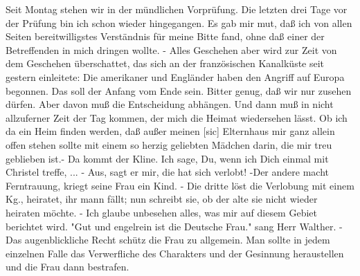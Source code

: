 \def\day{7. Juni 1944.}
\mktitle

Seit Montag stehen wir in der m\"{u}ndlichen Vorpr\"{u}fung.
Die letzten drei Tage vor der Pr\"{u}fung bin ich schon wieder hingegangen.
Es gab mir mut, da{\ss} ich von allen Seiten bereitwilligstes Verst\"{a}ndnis f\"{u}r meine Bitte fand, ohne da{\ss} einer der Betreffenden in mich dringen wollte.
- Alles Geschehen aber wird zur Zeit von dem Geschehen \"{u}berschattet, das sich an der franz\"{o}sischen Kanalk\"{u}ste seit gestern einleitete: Die amerikaner und Engl\"{a}nder haben den Angriff auf Europa begonnen.
Das soll der Anfang vom Ende sein.
Bitter genug, da{\ss} wir nur zusehen d\"{u}rfen.
Aber davon mu{\ss} die Entscheidung abh\"{a}ngen.
Und dann mu{\ss} in nicht allzuferner Zeit der Tag kommen, der mich die Heimat wiedersehen l\"{a}sst.
Ob ich da ein Heim finden werden, da{\ss} au{\ss}er meinen{\color{red} [sic] } Elternhaus mir ganz allein offen stehen sollte mit einem so herzig geliebten M\"{a}dchen darin, die mir treu geblieben ist.-
Da kommt der Kline.
Ich sage, Du, wenn ich Dich einmal mit Christel treffe, ... - Aus, sagt er mir, die hat sich verlobt!
-Der andere macht Ferntrauung, kriegt seine Frau ein Kind.
- Die dritte l\"{o}st die Verlobung mit einem Kg., heiratet, ihr mann f\"{a}llt; nun schreibt sie, ob der alte sie nicht wieder heiraten m\"{o}chte.
- Ich glaube unbesehen alles, was mir auf diesem Gebiet berichtet wird.
"Gut und engelrein ist die Deutsche Frau." sang Herr Walther.
- Das augenblickliche Recht sch\"{u}tz die Frau zu allgemein.
Man sollte in jedem einzelnen Falle das Verwerfliche des Charakters und der Gesinnung heraustellen und die Frau dann bestrafen.


\clearpage
